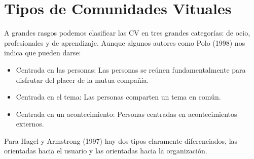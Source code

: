 
\section{Tipos de Comunidades Vituales}

A grandes rasgos podemos clasificar las CV en tres grandes categorías: de ocio, profesionales y de aprendizaje. Aunque algunos autores como Polo (1998) nos indica que pueden darse:
\begin{itemize}
\item Centrada en las personas: Las personas se reúnen fundamentalmente para disfrutar del placer de la mutua compañía.
\item Centrada en el tema: Las personas comparten un tema en común. 
\item Centrada en un acontecimiento: Personas centradas en acontecimientos externos.
\end{itemize}

Para Hagel y Armstrong (1997) hay dos tipos claramente diferenciados, las orientadas hacia el usuario y las orientadas hacia la organización. 

